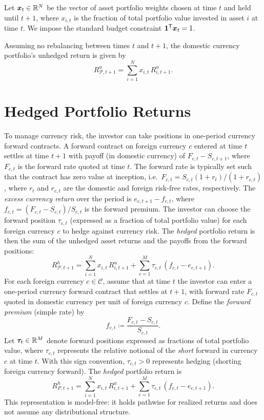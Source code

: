 Let $\bm{x}_t\in\mathbb{R}^N$ be the vector of asset portfolio weights chosen at time $t$ and held until $t{+}1$, where $x_{i,t}$ is the fraction of total portfolio value invested in asset $i$ at time $t$. We impose the standard budget constraint $\bm{1}^{\mathsf{T}} \bm{x}_t = 1$.

Assuming no rebalancing between times $t$ and $t{+}1$, the domestic currency portfolio's unhedged return is given by
\begin{equation*}
R^{u}_{\mathcal{P},t+1} = \sum_{i=1}^N x_{i,t}\,R^{u}_{i,t+1}.
\end{equation*}

\section{Hedged Portfolio Returns}

To manage currency risk, the investor can take positions in one-period currency forward contracts. A forward contract on foreign currency $c$ entered at time $t$ settles at time $t{+}1$ with payoff (in domestic currency) of $F_{c,t} - S_{c,t+1}$, where $F_{c,t}$ is the forward rate quoted at time $t$. The forward rate is typically set such that the contract has zero value at inception, i.e.\ $F_{c,t} = S_{c,t}(1+r_t)/(1+r_{c,t})$, where $r_t$ and $r_{c,t}$ are the domestic and foreign risk-free rates, respectively. The \emph{excess currency return} over the period is $e_{c,t+1} - f_{c,t}$, where $f_{c,t} = (F_{c,t} - S_{c,t})/S_{c,t}$ is the forward premium. The investor can choose the forward position $\tau_{c,t}$ (expressed as a fraction of total portfolio value) for each foreign currency $c$ to hedge against currency risk. The \emph{hedged} portfolio return is then the sum of the unhedged asset returns and the payoffs from the forward positions:
\begin{equation*}
R^{h}_{\mathcal{P},t+1} = \sum_{i=1}^N x_{i,t}\,R^{u}_{i,t+1} + \sum_{c=1}^M \tau_{c,t}\,(f_{c,t} - e_{c,t+1}).
\end{equation*}
For each foreign currency $c\in\mathcal{C}$, assume that at time $t$ the investor can enter a one-period currency forward contract that settles at $t{+}1$, with forward rate $F_{c,t}$ quoted in domestic currency per unit of foreign currency $c$. Define the \emph{forward premium} (simple rate) by
\begin{equation*}
f_{c,t} \coloneqq \frac{F_{c,t}-S_{c,t}}{S_{c,t}}.
\end{equation*}
Let $\bm{\tau}_t\in\mathbb{R}^M$ denote forward positions expressed as fractions of total portfolio value, where $\tau_{c,t}$ represents the relative notional of the \emph{short} forward in currency $c$ at time $t$. With this sign convention, $\tau_{c,t}>0$ represents hedging (shorting foreign currency forward). The \emph{hedged} portfolio return is
\begin{equation*}
R^{h}_{P,t+1}
=
\sum_{i=1}^N x_{i,t}\,R^{u}_{i,t+1}
+
\sum_{c=1}^M \tau_{c,t}\,(f_{c,t}-e_{c,t+1}).
\end{equation*}
This representation is model-free: it holds pathwise for realized returns and does not assume any distributional structure.

